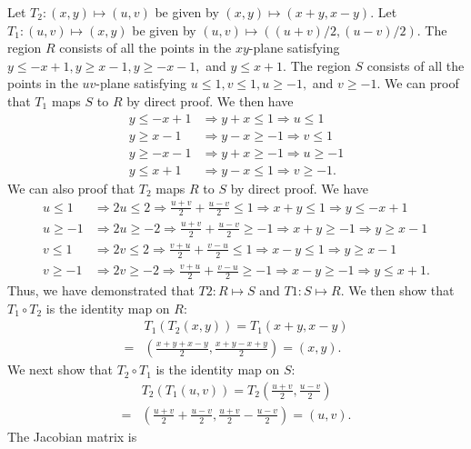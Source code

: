 \documentclass[8pt]{article}
\begin{document}
\begin{Answer}[number=22]
  Let $T_2:(x,y)\mapsto (u,v)$ be given by $(x,y)\mapsto(x+y, x-y)$.
  Let $T_1:(u,v)\mapsto (x,y)$ be given by $(u,v)\mapsto((u+v)/2, (u-v)/2)$.
  The region $R$ consists of all the points in the $xy$-plane satisfying $y\le
  -x+1, y\ge x-1, y\ge -x-1,$ and $y\le x+1$.
  The region $S$ consists of all the points in the $uv$-plane satisfying $u\le
  1, v\le 1, u\ge -1,$ and $v\ge -1$.
  We can proof that $T_1$ maps $S$ to $R$ by direct proof. We then have
  \begin{align*}
    y\le -x+1 & \Rightarrow y+x \le 1  \Rightarrow u \le 1   \\
    y\ge x-1  & \Rightarrow y-x \ge -1 \Rightarrow v \le 1   \\
    y\ge -x-1  & \Rightarrow y+x \ge -1 \Rightarrow u \ge -1  \\
    y\le x+1  & \Rightarrow y-x \le 1  \Rightarrow v \ge -1.
  \end{align*}
  We can also proof that $T_2$ maps $R$ to $S$ by direct proof. We have
  \begin{align*}
    u \le 1  & \Rightarrow 2u \le 2  \Rightarrow \frac{u+v}{2} + \frac{u-v}{2} \le 1
    \Rightarrow x+y \le 1 \Rightarrow y\le -x+1\\
    u \ge -1 & \Rightarrow 2u \ge -2 \Rightarrow \frac{u+v}{2} + \frac{u-v}{2} \ge -1
    \Rightarrow x+y \ge -1 \Rightarrow y\ge x-1\\
    v \le 1  & \Rightarrow 2v \le 2  \Rightarrow \frac{v+u}{2} + \frac{v-u}{2} \le 1
    \Rightarrow x-y \le 1 \Rightarrow y\ge x-1\\
    v \ge -1 & \Rightarrow 2v \ge -2 \Rightarrow \frac{v+u}{2} + \frac{v-u}{2} \ge -1
    \Rightarrow x-y \ge -1 \Rightarrow y\le x+1.
  \end{align*}
  Thus, we have demonstrated that $T2: R\mapsto S$ and $T1: S\mapsto R$. We
  then show that $T_1 \circ T_2$ is the identity map on $R$:
  \begin{align*}
    &T_1(T_2(x,y)) = T_1(x+y, x-y) \\= &(\frac{x+y+x-y}{2}, \frac{x+y-x+y}{2}) =
    (x,y).
  \end{align*}
  We next show that $T_2 \circ T_1$ is the identity map on $S$:
  \begin{align*}
    &T_2(T_1(u,v)) = T_2(\frac{u+v}{2}, \frac{u-v}{2}) \\ =
    &(\frac{u+v}{2}+\frac{u-v}{2}, \frac{u+v}{2}-\frac{u-v}{2})=
    (u,v).
  \end{align*}
  The Jacobian matrix is

\end{Answer}
\end{document}

